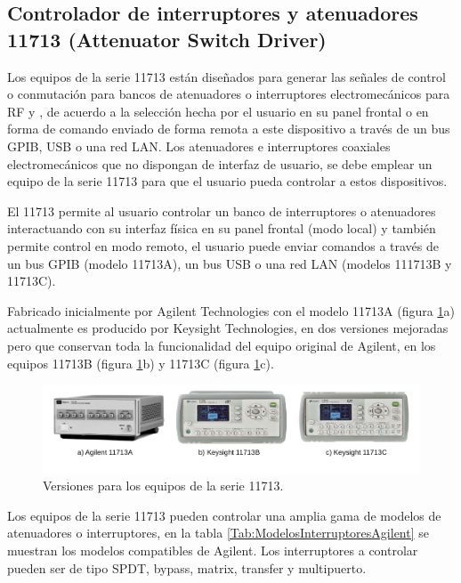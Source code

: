 \subsection{Controlador de interruptores y atenuadores 11713 (Attenuator Switch Driver)}
Los equipos de la serie 11713 están diseñados para generar las señales de control o conmutación para bancos de atenuadores o interruptores electromecánicos para RF y \textmu, de acuerdo a la selección hecha por el usuario en su panel frontal o en forma de comando enviado de forma remota a este dispositivo a través de un bus GPIB, USB o una red LAN.
Los atenuadores e interruptores coaxiales electromecánicos que no dispongan de interfaz de usuario, se debe emplear un equipo de la serie 11713 para que el usuario pueda controlar a estos dispositivos.

El 11713 permite al usuario controlar un banco de interruptores o atenuadores interactuando con su interfaz física en su panel frontal (modo local) y también permite control en modo remoto, el usuario puede enviar comandos a través de un bus GPIB (modelo 11713A), un bus USB o una red LAN (modelos 111713B y 11713C).

Fabricado inicialmente por Agilent Technologies con el modelo 11713A (figura \ref{Fig:Versiones11713}a) actualmente es producido por Keysight Technologies, en dos versiones mejoradas pero que conservan toda la funcionalidad del equipo original de Agilent, en los equipos 11713B (figura \ref{Fig:Versiones11713}b) y 11713C (figura \ref{Fig:Versiones11713}c).

\begin{figure}[h!]
{
	\centering
	\includegraphics[width=\textwidth]{./Imagenes/Versiones11713.pdf}
	\caption{Versiones para los equipos de la serie 11713.}
	\label{Fig:Versiones11713}
}
\end{figure}

Los equipos de la serie 11713 pueden controlar una amplia gama de modelos de atenuadores o interruptores, en la tabla \ref{Tab:ModelosInterruptoresAgilent} se muestran los modelos compatibles de Agilent. Los interruptores a controlar pueden ser de tipo
SPDT, bypass, matrix, transfer y multipuerto.


